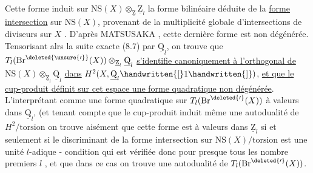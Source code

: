  Cette forme  induit sur $\mathrm{NS}(X)\otimes_{\underline{\mathrm Z}}\underline{\mathrm Z}_l$ la forme bilinéaire déduite de la \uline{forme intersection} sur $\mathrm{NS}(X)$, provenant de la multiplicité globale d'intersections de diviseurs sur $X$ \margin{\handwritten{$\times$}}\handwritten{[15]} \deleted{\unsure{;}}. D'après \margin{\handwritten{$\times$}}MATSUSAKA \handwritten{[27]}, cette dernière forme est non dégénérée. Tensorisant alrs la suite exacte (8.7) par $\underline{\mathrm Q}_l$, on trouve que $T_l(\mathrm{Br}^{\deleted{\unsure{\prime}}}(X))\otimes_{\underline{\mathrm Z}_l}\underline{\mathrm Q}_l$ \uline{s'identifie canoniquement à l'orthogonal de} $\mathrm{NS}(X)\otimes_{\underline{\mathrm Z}_l}\underline{\mathrm Q}_l$ \uline{dans} $H^2(X,\underline{\mathrm Q}_l\handwritten{[}1\handwritten{]})$, \uline{et que le cup-produit définit sur cet espace une forme quadratique non dégénérée}. L'interprétant comme une forme quadratique sur $T_l(\mathrm{Br}^{\deleted{\prime}}(X))$ à valeurs dans $\underline{\mathrm Q}_l$, (et tenant compte que le cup-produit induit même une autodualité de $H^2/\text{torsion}$\unsure{)|),|;)} on trouve aisément que cette forme est à valeurs dans $\underline{\mathrm Z}_l$ si et seulement si le discriminant de la forme intersection sur $\mathrm{NS}(X)/\text{torsion}$ est une unité $l$-adique - condition qui est vérifiée donc pour presque tous les nombre premiers $l$ \unsure{-}, et que dans ce cas on trouve une autodualité de $T_l(\mathrm{Br}^{\deleted{\prime}}(X))$.

